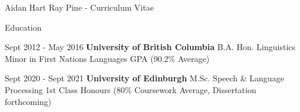 \documentclass[12pt]{letter}
\date{}
\begin{document}
        \begin{cv}{ Aidan Hart Ray Pine  \space - \space   Curriculum Vitae}
        \vspace{1mm}
      \begin{cvlist}{Education}
                        
                    \item[Sept 2012 - May 2016] \textbf{University of British Columbia}
                \newline B.A. Hon. Linguistics
                \newline Minor in First Nations Languages
                 GPA (90.2\% Average)
        
                        
                    \item[Sept 2020 - Sept 2021] \textbf{University of Edinburgh}
                \newline M.Sc. Speech \& Language Processing
                \newline 1st Class Honours (80\% Coursework Average, Dissertation forthcoming)
                \newline 
        
                    \end{cvlist}
        

\end{cv}
\end{document}
